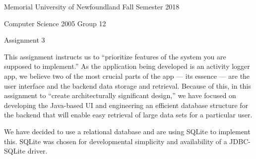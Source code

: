 \documentclass{article}
\begin{document}
	{\bf\parindent=0pt
	
	Memorial University of Newfoundland \hfill Fall Semester 2018 
	
	Computer Science 2005 \hfill Group 12

	}

	\vskip 2pc
	
	{\bf\Large
	
	\hfill Assignment 3 \hfill
	}

	\vskip 1pc
	
	This assignment instructs us to ``prioritize features of the system you are supposed to implement.'' As the application being developed is an activity logger app, we believe two of the most crucial parts of the app --- its essence --- are the user interface and the backend data storage and retrieval. Because of this, in this assignment to ``create architecturally significant design,'' we have focused on developing the Java-based UI and engineering an efficient database structure for the backend that will enable easy retrieval of large data sets for a particular user. 
	
	We have decided to use a relational database and are using SQLite to implement this. SQLite was chosen for developmental simplicity and availability of a JDBC-SQLite driver.
	
	
	
	
	
	
	
	
	
	
	
	
	
	
	
	
	
\end{document}
